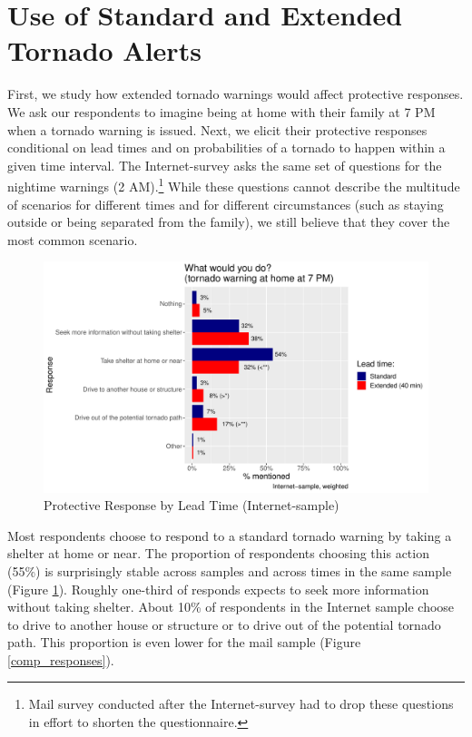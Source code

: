 \documentclass{ametsocV6.1}
\begin{document}
\vspace{20pt}
\section{Use of Standard and Extended Tornado Alerts}

First, we study how extended tornado warnings would affect protective responses. We ask our respondents to imagine being at home with their family at 7 PM when a tornado warning is issued. Next, we elicit their protective responses conditional on lead times and on probabilities of a tornado to happen within a given time interval. The Internet-survey asks the same set of questions for the nightime warnings (2 AM).\footnote{Mail survey conducted after the Internet-survey had to drop these questions in effort to shorten the questionnaire.} While these questions cannot describe the multitude of scenarios for different times and for different circumstances (such as staying outside or being separated from the family), we still believe that they cover the most common scenario. 
\begin{figure}[!htbp] 
\centering
\includegraphics[width=33pc]{../Graphs/contr_plot_allQ.pdf}
\caption{Protective Response by Lead Time (Internet-sample)}\label{contr_plot}
\end{figure}
Most respondents choose to respond to a standard tornado warning by taking a shelter at home or near.  The proportion of respondents choosing this action (55\%) is surprisingly stable across samples and across times in the same sample (Figure \ref{contr_plot}). Roughly one-third of responds expects to seek more information without taking shelter. About 10\% of respondents in the Internet sample choose to drive to another house or structure or to drive out of the potential tornado path. This proportion is even lower for the mail sample (Figure \ref{comp_responses}).
\end{document}
